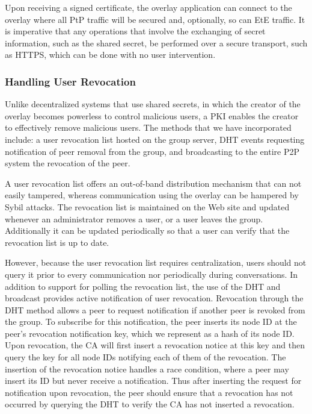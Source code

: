 \documentclass[conference]{IEEEtran}
\begin{document}
Upon receiving a signed certificate, the overlay application can connect to the
overlay where all PtP traffic will be secured and, optionally, so can EtE
traffic.  It is imperative that any operations that involve the exchanging of
secret information, such as the shared secret, be performed over a secure
transport, such as HTTPS, which can be done with no user intervention.

\subsubsection{Handling User Revocation}
Unlike decentralized systems that use shared secrets, in which the creator of
the overlay becomes powerless to control malicious users, a PKI enables the
creator to effectively remove malicious users.  The methods that we have
incorporated include:  a user revocation list hosted on the group server,
DHT events requesting notification of peer removal from the group, and
broadcasting to the entire P2P system the revocation of the peer.

A user revocation list offers an out-of-band distribution mechanism that can
not easily tampered, whereas communication using the overlay can be hampered
by Sybil attacks.  The revocation list is maintained on the Web site and updated
whenever an administrator removes a user, or a user leaves the group.
Additionally it can be updated periodically so that a user can verify that the revocation
list is up to date.

However, because the user revocation list requires centralization, users should
not query it prior to every communication nor periodically during conversations.
In addition to support for polling the revocation list, the use of the DHT and broadcast provides active notification of
user revocation.  Revocation through the DHT method allows a peer to request
notification if another peer is revoked from the group.  To subscribe for this
notification, the peer inserts its node ID at the peer's revocation
notification key, which we represent as a hash of its node ID.  Upon revocation,
the CA will first insert a revocation notice at this key and then query the
key for all node IDs notifying each of them of the revocation.  The insertion
of the revocation notice handles a race condition, where a peer may insert
its ID but never receive a notification.  Thus after inserting the request for
notification upon revocation, the peer should ensure that a revocation has not
occurred by querying the DHT to verify the CA has not inserted a revocation.
\end{document}
